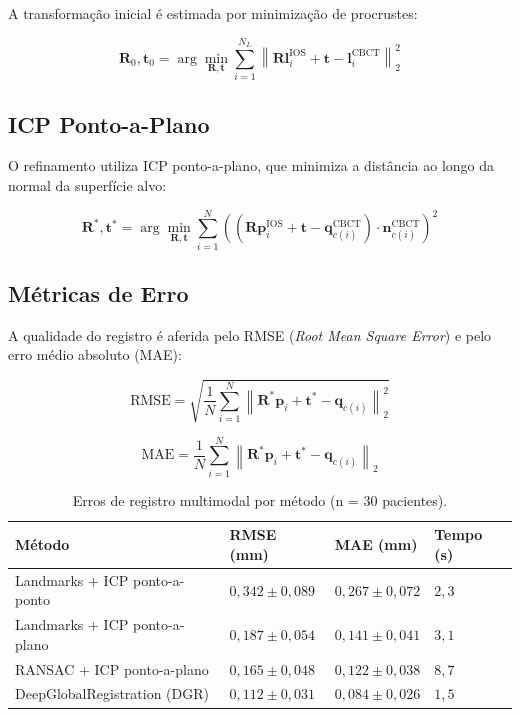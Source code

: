A transformação inicial é estimada por minimização de procrustes:

\begin{equation}
\label{eq:procrustes}
\mathbf{R}_0, \mathbf{t}_0 = \arg\min_{\mathbf{R}, \mathbf{t}} \sum_{i=1}^{N_L} \left\| \mathbf{R} \mathbf{l}_i^{\text{IOS}} + \mathbf{t} - \mathbf{l}_i^{\text{CBCT}} \right\|_2^2
\end{equation}

\subsection{ICP Ponto-a-Plano}
\label{subsec:icp-multimodal}

O refinamento utiliza ICP ponto-a-plano, que minimiza a distância ao longo da normal da superfície alvo:

\begin{equation}
\label{eq:icp-point-plane-registro}
\mathbf{R}^*, \mathbf{t}^* = \arg\min_{\mathbf{R}, \mathbf{t}} \sum_{i=1}^{N} \left( (\mathbf{R} \mathbf{p}_i^{\text{IOS}} + \mathbf{t} - \mathbf{q}_{c(i)}^{\text{CBCT}}) \cdot \mathbf{n}_{c(i)}^{\text{CBCT}} \right)^2
\end{equation}

\subsection{Métricas de Erro}
\label{subsec:metricas-erro}

A qualidade do registro é aferida pelo RMSE (\textit{Root Mean Square Error}) e pelo erro médio absoluto (MAE):

\begin{equation}
\label{eq:rmse}
\text{RMSE} = \sqrt{\frac{1}{N} \sum_{i=1}^{N} \left\| \mathbf{R}^* \mathbf{p}_i + \mathbf{t}^* - \mathbf{q}_{c(i)} \right\|_2^2}
\end{equation}

\begin{equation}
\label{eq:mae}
\text{MAE} = \frac{1}{N} \sum_{i=1}^{N} \left\| \mathbf{R}^* \mathbf{p}_i + \mathbf{t}^* - \mathbf{q}_{c(i)} \right\|_2
\end{equation}

\begin{longtable}{p{3cm}p{2.5cm}p{2.5cm}p{2.5cm}}
\caption{Erros de registro multimodal por método (n = 30 pacientes).}
\label{tab:erros-registro}\\
\toprule
\textbf{Método} & \textbf{RMSE (mm)} & \textbf{MAE (mm)} & \textbf{Tempo (s)} \\
\midrule
Landmarks + ICP ponto-a-ponto & $0,342 \pm 0,089$ & $0,267 \pm 0,072$ & $2,3$ \\
Landmarks + ICP ponto-a-plano & $0,187 \pm 0,054$ & $0,141 \pm 0,041$ & $3,1$ \\
RANSAC + ICP ponto-a-plano & $0,165 \pm 0,048$ & $0,122 \pm 0,038$ & $8,7$ \\
DeepGlobalRegistration (DGR) & $0,112 \pm 0,031$ & $0,084 \pm 0,026$ & $1,5$ \\
\bottomrule
\end{longtable}


